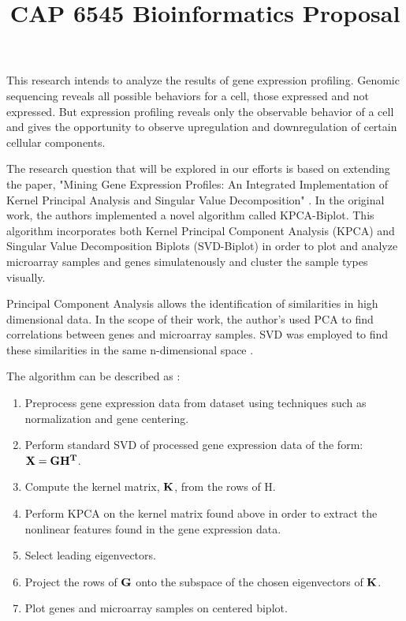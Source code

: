 \documentclass[10pt,a4,oneside]{report}
\begin{document}
\title{CAP 6545 Bioinformatics Proposal}
\maketitle

This research intends to analyze the results of gene expression profiling. Genomic sequencing reveals all possible behaviors for a cell, those expressed and not expressed. But expression profiling reveals only the observable behavior of a cell and gives the opportunity to observe upregulation and downregulation of certain cellular components.

The research question that will be explored in our efforts is based on extending the paper, "Mining Gene Expression Profiles: An Integrated Implementation of Kernel Principal Analysis and Singular Value Decomposition" \cite{Reverter2010200}.  In the original work, the authors implemented a novel algorithm called KPCA-Biplot. This algorithm incorporates both Kernel Principal Component Analysis (KPCA) and Singular Value Decomposition Biplots (SVD-Biplot) in order to plot and analyze microarray samples and genes simulatenously and cluster the sample types visually. 

Principal Component Analysis allows the identification of similarities in high dimensional data. In the scope of their work, the author's used PCA to find correlations between genes and microarray samples. SVD was employed to find these similarities in the same n-dimensional space \cite{Reverter2010200}.

The algorithm can be described as \cite{Reverter2010200}: %

\begin{enumerate}  \itemsep -2pt %
\item
Preprocess gene expression data from dataset using techniques such as normalization and gene centering.
\item 
Perform standard SVD of processed gene expression data of the form: $\bf{X} = \bf{G}\bf{H}^{T}$.
\item
Compute the kernel matrix, $\bf{K}$, from  the rows of H.
\item
Perform KPCA on the kernel matrix found above in order to extract the nonlinear features found in the gene expression data.
\item
Select leading eigenvectors.
\item
Project the rows of $\bf{G}$ onto the subspace of the chosen eigenvectors of $\bf{K}$.
\item
Plot genes and microarray samples on centered biplot.
\end{enumerate}
\end{document}
